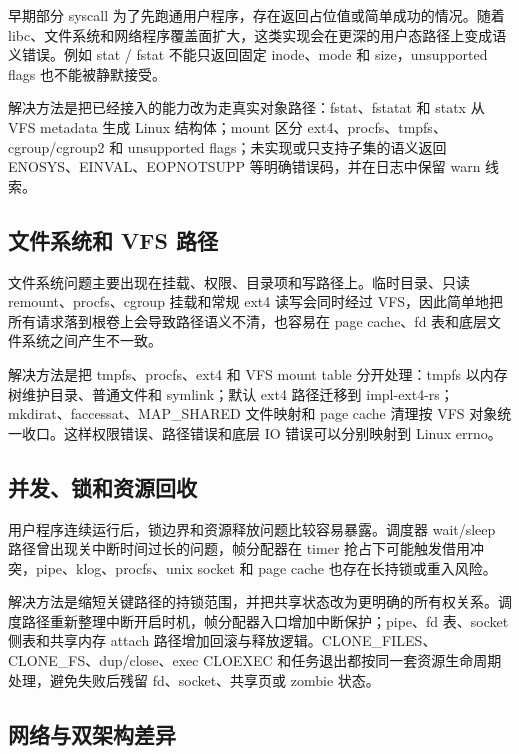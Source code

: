 \documentclass[12pt,openany,oneside,AutoFakeBold=true]{ctexbook}
\newcommand{\code}[1]{\textnormal{\rmfamily #1}}
\newcommand{\syscall}[1]{\textnormal{\rmfamily #1}}
\begin{document}
早期部分 syscall 为了先跑通用户程序，存在返回占位值或简单成功的情况。随着 libc、文件系统和网络程序覆盖面扩大，这类实现会在更深的用户态路径上变成语义错误。例如 \syscall{stat} / \syscall{fstat} 不能只返回固定 inode、mode 和 size，unsupported flags 也不能被静默接受。

解决方法是把已经接入的能力改为走真实对象路径：\syscall{fstat}、\syscall{fstatat} 和 \syscall{statx} 从 VFS metadata 生成 Linux 结构体；\syscall{mount} 区分 ext4、procfs、tmpfs、cgroup/cgroup2 和 unsupported flags；未实现或只支持子集的语义返回 \code{ENOSYS}、\code{EINVAL}、\code{EOPNOTSUPP} 等明确错误码，并在日志中保留 warn 线索。

\subsection{文件系统和 VFS 路径}

文件系统问题主要出现在挂载、权限、目录项和写路径上。临时目录、只读 remount、procfs、cgroup 挂载和常规 ext4 读写会同时经过 VFS，因此简单地把所有请求落到根卷上会导致路径语义不清，也容易在 page cache、fd 表和底层文件系统之间产生不一致。

解决方法是把 tmpfs、procfs、ext4 和 VFS mount table 分开处理：tmpfs 以内存树维护目录、普通文件和 symlink；默认 ext4 路径迁移到 \code{impl-ext4-rs}；\syscall{mkdirat}、\syscall{faccessat}、\code{MAP\_SHARED} 文件映射和 page cache 清理按 VFS 对象统一收口。这样权限错误、路径错误和底层 IO 错误可以分别映射到 Linux errno。

\subsection{并发、锁和资源回收}

用户程序连续运行后，锁边界和资源释放问题比较容易暴露。调度器 wait/sleep 路径曾出现关中断时间过长的问题，帧分配器在 timer 抢占下可能触发借用冲突，pipe、klog、procfs、unix socket 和 page cache 也存在长持锁或重入风险。

解决方法是缩短关键路径的持锁范围，并把共享状态改为更明确的所有权关系。调度路径重新整理中断开启时机，帧分配器入口增加中断保护；pipe、fd 表、socket 侧表和共享内存 attach 路径增加回滚与释放逻辑。\code{CLONE\_FILES}、\code{CLONE\_FS}、dup/close、exec CLOEXEC 和任务退出都按同一套资源生命周期处理，避免失败后残留 fd、socket、共享页或 zombie 状态。

\subsection{网络与双架构差异}
\end{document}
